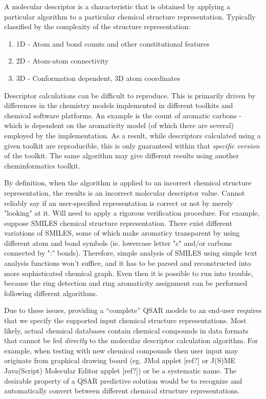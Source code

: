 \documentclass[12pt,letterpaper]{article}
\begin{document}
A molecular descriptor is a characteristic that is obtained by applying
a particular algorithm to a particular chemical structure representation.
Typically classified by the complexity of the structure representation:
\begin{enumerate}
  \item 1D - Atom and bond counts and other constitutional features
  \item 2D - Atom-atom connectivity
  \item 3D - Conformation dependent, 3D atom coordinates
\end{enumerate}

Descriptor calculations can be difficult to reproduce. This is
primarily driven by differences in the chemistry models implemented in
different toolkits and chemical software platforms. An example is the
count of aromatic carbons - which is dependent on the aromaticity
model (of which there are several) employed by the implementation. As
a result, while descriptors calculated using a given toolkit are
reproducible, this is only guaranteed within that \emph{specific
  version} of the toolkit. The same algorithm may give different
results using another cheminformatics toolkit.

By definition, when the algorithm
is applied to an incorrect chemical structure representation, the
results is an incorrect molecular descriptor value. Cannot reliably
say if an user-specified representation is correct or not by merely
"looking" at it. Will need to apply a rigorous verification
procedure. For example, suppose SMILES chemical structure
representation.  There exist different variations of SMILES, some of
which make aromaticy transparent by using different atom and bond
symbols (ie. lowercase letter "c" and/or carbons connected by ":"
bonds). Therefore, simple analysis of SMILES using simple text
analysis functions won't suffice, and it has to be parsed and
reconstructed into more sophisticated chemical graph. Even then it is
possible to run into trouble, because the ring detection and ring
aromaticity assignment can be performed following different
algorithms.

Due to these issues,
providing a ``complete'' QSAR models to an end-user requires that we
specify the supported input chemical structure representations. Most
likely, actual chemical databases contain chemical compounds in data
formats that cannot be fed \emph{directly} to the molecular descriptor
calculation algorithm. For example, when testing with new chemical
compounds then user input may originate from graphical drawing board
(eg. JMol applet [ref?] or J(S)ME Java(Script) Molecular Editor applet
[ref?]) or be a systematic name. The desirable property of a QSAR
predictive solution would be to recognize and automatically convert
between different chemical structure representations.
\end{document}
